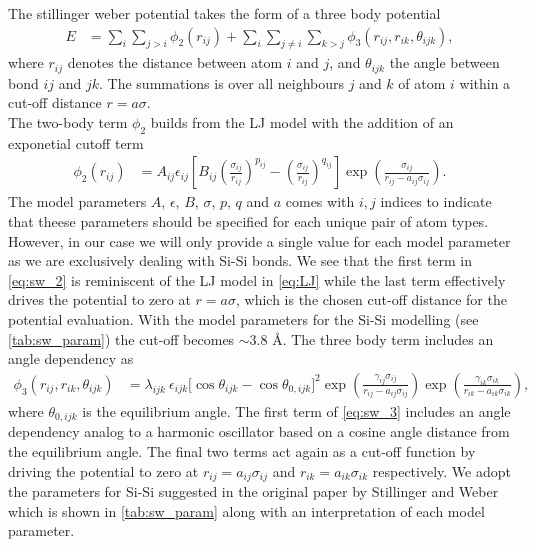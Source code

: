 The stillinger weber potential takes the form of a three body potential
\begin{align*}
  E &=\sum_i \sum_{j>i} \phi_2(r_{i j})+\sum_i \sum_{j \neq i} \sum_{k>j} \phi_3(r_{ij}, r_{ik}, \theta_{ijk}),
\end{align*}
where $r_{ij}$ denotes the distance between atom $i$ and $j$, and $\theta_{ijk}$
the angle between bond $ij$ and $jk$. The summations is over all neighbours $j$
and $k$ of atom $i$ within a cut-off distance $r = a\sigma$. \\
The two-body term $\phi_2$ builds from the LJ model with the addition of an
exponetial cutoff term
\begin{align}
  \phi_2(r_{i j}) & =A_{ij} \epsilon_{ij}\left[B_{ij}\left(\frac{\sigma_{ij}}{r_{ij}}\right)^{p_{ij}} - \left(\frac{\sigma_{ij}}{r_{ij}}\right)^{q_{ij}}\right] \exp (\frac{\sigma_{ij}}{r_{ij}-a_{ij} \sigma_{ij}}).
  \label{eq:sw_2}
\end{align}
The model parameters $A$, $\epsilon$, $B$, $\sigma$, $p$, $q$ and $a$ comes with
$i,j$ indices to indicate that theese parameters should be specified for each
unique pair of atom types. However, in our case we will only provide a single
value for each model parameter as we are exclusively dealing with Si-Si bonds.
We see that the first term in \cref{eq:sw_2} is reminiscent of the LJ model in
\cref{eq:LJ} while the last term effectively drives the potential to zero at
$r=a\sigma$, which is the chosen cut-off distance for the potential
evaluation. With the model parameters for the Si-Si modelling (see
\cref{tab:sw_param}) the cut-off becomes $\sim 3.8$ Å. The three body term includes an angle dependency as
\begin{align}
  \phi_3(r_{ij}, r_{ik}, \theta_{ijk}) &= \lambda_{ijk} \ \epsilon_{ijk} \Big[\cos \theta_{ijk}-\cos \theta_{0,ijk}\Big]^2 \exp (\frac{\gamma_{ij} \sigma_{ij}}{r_{ij} - a_{ij} \sigma_{ij}}) \exp (\frac{\gamma_{ik} \sigma_{ik}}{r_{ik} - a_{ik} \sigma_{ik}}),
  \label{eq:sw_3}
\end{align}
where $\theta_{0,ijk}$ is the equilibrium angle. The first term of
\cref{eq:sw_3} includes an angle dependency analog to a harmonic oscillator
based on a cosine angle distance from the equilibrium angle. The final two terms
act again as a cut-off function by driving the potential to zero at $r_{ij} =
a_{ij}\sigma_{ij}$ and $r_{ik} = a_{ik}\sigma_{ik}$ respectively. We adopt the parameters for Si-Si suggested in the original paper by Stillinger and Weber \cite{PhysRevB.31.5262} which is shown in \cref{tab:sw_param} along with an interpretation of each model parameter.



